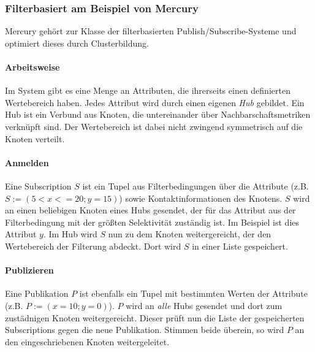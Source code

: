 \subsubsection{Filterbasiert am Beispiel von Mercury}
\label{chap:related:mercury}
Mercury \cite{Bharambe2004Mercury} gehört zur Klasse der filterbasierten Publish/Subscribe-Systeme und optimiert dieses durch Clusterbildung.

\paragraph*{Arbeitsweise}
Im System gibt es eine Menge an Attributen, die ihrerseits einen definierten Wertebereich haben. Jedes Attribut wird durch einen eigenen \emph{Hub} gebildet. Ein Hub ist ein Verbund aus Knoten, die untereinander über Nachbarschaftsmetriken verknüpft sind. Der Wertebereich ist dabei nicht zwingend symmetrisch auf die Knoten verteilt.

\paragraph*{Anmelden}
Eine Subscription $S$ ist ein Tupel aus Filterbedingungen über die Attribute (z.B. $S := (5 < x <= 20; y = 15)$) sowie Kontaktinformationen des Knotens. $S$ wird an einen beliebigen Knoten eines Hubs gesendet, der für das Attribut aus der Filterbedingung mit der größten Selektivität zuständig ist. Im Beispiel ist dies Attribut $y$. Im Hub wird $S$ nun zu dem Knoten weitergereicht, der den Wertebereich der Filterung abdeckt. Dort wird $S$ in einer Liste gespeichert.

\paragraph*{Publizieren}
Eine Publikation $P$ ist ebenfalls ein Tupel mit bestimmten Werten der Attribute (z.B. $P := (x = 10; y = 0)$). $P$ wird an \emph{alle} Hubs gesendet und dort zum zustädnigen Knoten weitergereicht. Dieser prüft nun die Liste der gespeicherten Subscriptions gegen die neue Publikation. Stimmen beide überein, so wird $P$ an den eingeschriebenen Knoten weitergeleitet.


